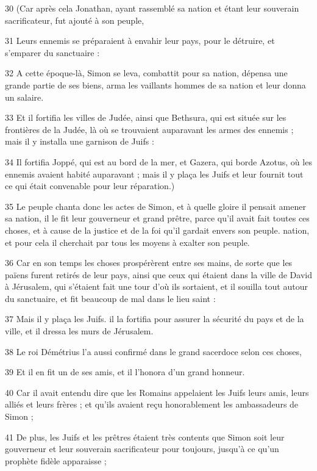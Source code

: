 \par 30 (Car après cela Jonathan, ayant rassemblé sa nation et étant leur souverain sacrificateur, fut ajouté à son peuple,
\par 31 Leurs ennemis se préparaient à envahir leur pays, pour le détruire, et s'emparer du sanctuaire :
\par 32 A cette époque-là, Simon se leva, combattit pour sa nation, dépensa une grande partie de ses biens, arma les vaillants hommes de sa nation et leur donna un salaire.
\par 33 Et il fortifia les villes de Judée, ainsi que Bethsura, qui est située sur les frontières de la Judée, là où se trouvaient auparavant les armes des ennemis ; mais il y installa une garnison de Juifs :
\par 34 Il fortifia Joppé, qui est au bord de la mer, et Gazera, qui borde Azotus, où les ennemis avaient habité auparavant ; mais il y plaça les Juifs et leur fournit tout ce qui était convenable pour leur réparation.)
\par 35 Le peuple chanta donc les actes de Simon, et à quelle gloire il pensait amener sa nation, il le fit leur gouverneur et grand prêtre, parce qu'il avait fait toutes ces choses, et à cause de la justice et de la foi qu'il gardait envers son peuple. nation, et pour cela il cherchait par tous les moyens à exalter son peuple.
\par 36 Car en son temps les choses prospérèrent entre ses mains, de sorte que les païens furent retirés de leur pays, ainsi que ceux qui étaient dans la ville de David à Jérusalem, qui s'étaient fait une tour d'où ils sortaient, et il souilla tout autour du sanctuaire, et fit beaucoup de mal dans le lieu saint :
\par 37 Mais il y plaça les Juifs. il la fortifia pour assurer la sécurité du pays et de la ville, et il dressa les murs de Jérusalem.
\par 38 Le roi Démétrius l'a aussi confirmé dans le grand sacerdoce selon ces choses,
\par 39 Et il en fit un de ses amis, et il l'honora d'un grand honneur.
\par 40 Car il avait entendu dire que les Romains appelaient les Juifs leurs amis, leurs alliés et leurs frères ; et qu'ils avaient reçu honorablement les ambassadeurs de Simon ;
\par 41 De plus, les Juifs et les prêtres étaient très contents que Simon soit leur gouverneur et leur souverain sacrificateur pour toujours, jusqu'à ce qu'un prophète fidèle apparaisse ;

